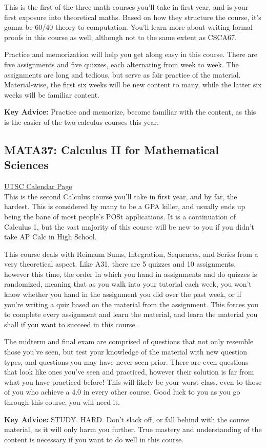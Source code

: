 \documentclass[11pt]{article}
\begin{document}
This is the first of the three math courses you'll take in first year, and is your first exposure into theoretical maths.  Based on how they structure the course, it's gonna be 60/40 theory to computation.  You'll learn more about writing formal proofs in this course as well, although not to the same extent as CSCA67.\par
Practice and memorization will help you get along easy in this course.  There are five assignments and five quizzes, each alternating from week to week.  The assignments are long and tedious, but serve as fair practice of the material.  Material-wise, the first six weeks will be new content to many, while the latter six weeks will be familiar content.\par
\textbf{Key Advice:} Practice and memorize, become familiar with the content, as this is the easier of the two calculus courses this year.

\subsection{MATA37: Calculus II for Mathematical Sciences}

\href{https://utsc.calendar.utoronto.ca/course/MATA37H3}{UTSC Calendar Page}\\

This is the second Calculus course you'll take in first year, and by far, the hardest.  This is considered by many to be a GPA killer, and usually ends up being the bane of most people's POSt applications. It is a continuation of Calculus 1, but the vast majority of this course will be new to you if you didn't take AP Calc in High School.\par
This course deals with Reimann Sums, Integration, Sequences, and Series from a very theoretical aspect.  Like A31, there are 5 quizzes and 10 assignments, however this time, the order in which you hand in assignments and do quizzes is randomized, meaning that as you walk into your tutorial each week, you won't know whether you hand in the assignment you did over the past week, or if you're writing a quiz based on the material from the assignment.  This forces you to complete every assignment and learn the material, and learn the material you shall if you want to succeed in this course. \par
The midterm and final exam are comprised of questions that not only resemble those you've seen, but test your knowledge of the material with new question types, and questions you may have never seen prior. There are even questions that look like ones you've seen and practiced, however their solution is far from what you have practiced before! This will likely be your worst class, even to those of you who achieve a 4.0 in every other course. Good luck to you as you go through this course, you will need it.\par
\textbf{Key Advice:} STUDY. HARD. Don't slack off, or fall behind with the course material, as it will only harm you further.  True mastery and understanding of the content is necessary if you want to do well in this course.
\end{document}
